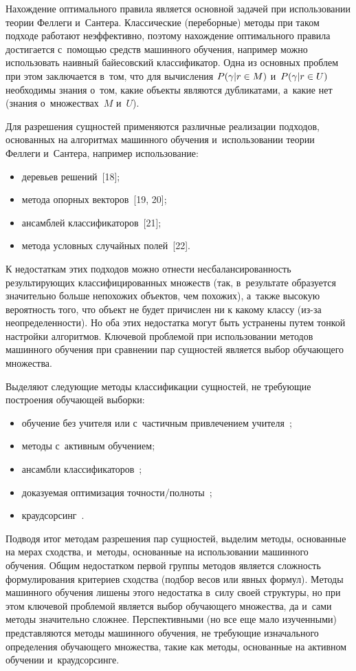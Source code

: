 \begin{multicols}{2}
  Нахождение оптимального правила является основной задачей при использовании теории
Феллеги и~Сантера. Классические (переборные) методы при таком подходе работают
неэффективно, поэтому нахождение оптимального правила достигается с~помощью средств
машинного обучения, например можно использовать наивный байесовский классификатор.
Одна из основных проблем при этом заключается в~том, что для вычисления $P(\gamma \vert
r \hm\in M)$ и~$P(\gamma\vert r \hm\in U)$ необходимы знания о~том, какие объекты
являются дубликатами, а~какие нет (знания о~множествах~$M$ и~$U$).

  Для разрешения сущностей применяются различные реализации подходов, основанных на
алгоритмах машинного обучения и~использовании теории Феллеги и~Сантера, например
использование:
  \begin{itemize}
\item деревьев решений~[18];
\item метода опорных векторов~[19, 20];
\item ансамблей классификаторов~[21];
\item метода условных случайных полей~[22].
\end{itemize}

  К недостаткам этих подходов можно отнести несбалансированность результирующих
классифицированных множеств (так, в~результате образуется значительно больше
непохожих объектов, чем похожих), а~также высокую вероятность того, что объект не будет
причислен ни к какому классу (из-за неопределенности). Но оба этих недостатка могут быть
устранены путем тонкой настройки алгоритмов. Ключевой проблемой при использовании
методов машинного обучения при сравнении пар сущностей является выбор обучающего
множества.

  Выделяют следующие методы классификации сущностей, не требующие построения
обучающей выборки:
  \begin{itemize}
\item обучение без учителя или с~частичным привлечением учителя~\cite{14-vov, 23-vov};
\item методы с~активным обучением;
\item ансамбли классификаторов~\cite{25-vov, 24-vov};
\item доказуемая оптимизация точ\-ности/пол\-но\-ты~\cite{26-vov, 27-vov};
\item краудсорсинг~\cite{28-vov, 29-vov}.
\end{itemize}

  Подводя итог методам разрешения пар сущностей, выделим методы, основанные на мерах
сходства, и~методы, основанные на использовании машинного обучения. Общим
недостатком первой группы методов является сложность формулирования критериев
сходства (подбор весов или явных формул). Методы машинного обучения лишены этого
недостатка в~силу своей структуры, но при этом ключевой проблемой является выбор
обучающего множества, да и~сами методы значительно сложнее. Перспективными (но все
еще мало из\-учен\-ны\-ми) представляются методы машинного обуче\-ния, не требующие
изначального определения обучающего множества, такие как методы, основанные на
активном обучении и~краудсор\-синге.
{

}
\end{multicols}
